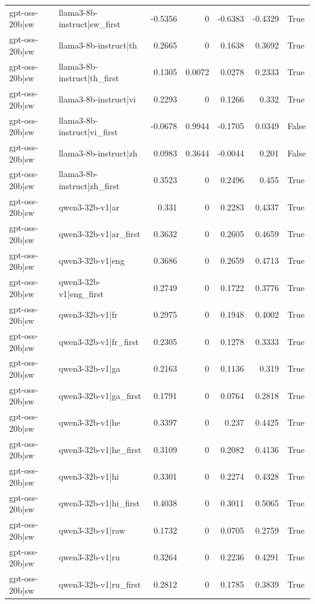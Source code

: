 \begin{table}
\begin{tabular}{l l r r r r l}
gpt-oss-20b|sw & llama3-8b-instruct|sw_first & -0.5356 & 0 & -0.6383 & -0.4329 & True \\
gpt-oss-20b|sw & llama3-8b-instruct|th & 0.2665 & 0 & 0.1638 & 0.3692 & True \\
gpt-oss-20b|sw & llama3-8b-instruct|th_first & 0.1305 & 0.0072 & 0.0278 & 0.2333 & True \\
gpt-oss-20b|sw & llama3-8b-instruct|vi & 0.2293 & 0 & 0.1266 & 0.332 & True \\
gpt-oss-20b|sw & llama3-8b-instruct|vi_first & -0.0678 & 0.9944 & -0.1705 & 0.0349 & False \\
gpt-oss-20b|sw & llama3-8b-instruct|zh & 0.0983 & 0.3644 & -0.0044 & 0.201 & False \\
gpt-oss-20b|sw & llama3-8b-instruct|zh_first & 0.3523 & 0 & 0.2496 & 0.455 & True \\
gpt-oss-20b|sw & qwen3-32b-v1|ar & 0.331 & 0 & 0.2283 & 0.4337 & True \\
gpt-oss-20b|sw & qwen3-32b-v1|ar_first & 0.3632 & 0 & 0.2605 & 0.4659 & True \\
gpt-oss-20b|sw & qwen3-32b-v1|eng & 0.3686 & 0 & 0.2659 & 0.4713 & True \\
gpt-oss-20b|sw & qwen3-32b-v1|eng_first & 0.2749 & 0 & 0.1722 & 0.3776 & True \\
gpt-oss-20b|sw & qwen3-32b-v1|fr & 0.2975 & 0 & 0.1948 & 0.4002 & True \\
gpt-oss-20b|sw & qwen3-32b-v1|fr_first & 0.2305 & 0 & 0.1278 & 0.3333 & True \\
gpt-oss-20b|sw & qwen3-32b-v1|ga & 0.2163 & 0 & 0.1136 & 0.319 & True \\
gpt-oss-20b|sw & qwen3-32b-v1|ga_first & 0.1791 & 0 & 0.0764 & 0.2818 & True \\
gpt-oss-20b|sw & qwen3-32b-v1|he & 0.3397 & 0 & 0.237 & 0.4425 & True \\
gpt-oss-20b|sw & qwen3-32b-v1|he_first & 0.3109 & 0 & 0.2082 & 0.4136 & True \\
gpt-oss-20b|sw & qwen3-32b-v1|hi & 0.3301 & 0 & 0.2274 & 0.4328 & True \\
gpt-oss-20b|sw & qwen3-32b-v1|hi_first & 0.4038 & 0 & 0.3011 & 0.5065 & True \\
gpt-oss-20b|sw & qwen3-32b-v1|raw & 0.1732 & 0 & 0.0705 & 0.2759 & True \\
gpt-oss-20b|sw & qwen3-32b-v1|ru & 0.3264 & 0 & 0.2236 & 0.4291 & True \\
gpt-oss-20b|sw & qwen3-32b-v1|ru_first & 0.2812 & 0 & 0.1785 & 0.3839 & True \\

\end{tabular}
\end{table}
